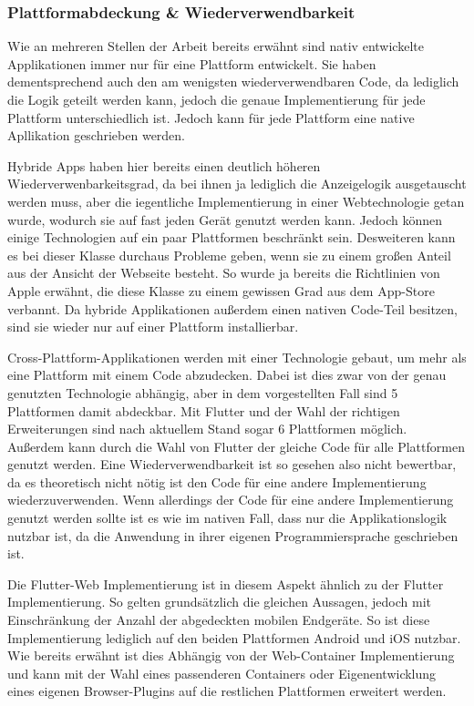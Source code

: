 \subsubsection{Plattformabdeckung \& Wiederverwendbarkeit}
Wie an mehreren Stellen der Arbeit bereits erwähnt sind nativ entwickelte Applikationen immer nur für eine Plattform entwickelt. Sie haben dementsprechend auch den am wenigsten wiederverwendbaren Code, da lediglich die Logik geteilt werden kann, jedoch die genaue Implementierung für jede Plattform unterschiedlich ist. Jedoch kann für jede Plattform eine native Apllikation geschrieben werden.

Hybride Apps haben hier bereits einen deutlich höheren Wiederverwenbarkeitsgrad, da bei ihnen ja lediglich die Anzeigelogik ausgetauscht werden muss, aber die iegentliche Implementierung in einer Webtechnologie getan wurde, wodurch sie auf fast jeden Gerät genutzt werden kann. Jedoch können einige Technologien auf ein paar Plattformen beschränkt sein. Desweiteren kann es bei dieser Klasse durchaus Probleme geben, wenn sie zu einem großen Anteil aus der Ansicht der Webseite besteht. So wurde ja bereits die Richtlinien von Apple erwähnt, die diese Klasse zu einem gewissen Grad aus dem App-Store verbannt. Da hybride Applikationen außerdem einen nativen Code-Teil besitzen, sind sie wieder nur auf einer Plattform installierbar. 

Cross-Plattform-Applikationen werden mit einer Technologie gebaut, um mehr als eine Plattform mit einem Code abzudecken. Dabei ist dies zwar von der genau genutzten Technologie abhängig, aber in dem vorgestellten Fall sind 5 Plattformen damit abdeckbar. Mit Flutter und der Wahl der richtigen Erweiterungen sind nach aktuellem Stand sogar 6 Plattformen möglich. Außerdem kann durch die Wahl von Flutter der gleiche Code für alle Plattformen genutzt werden. Eine Wiederverwendbarkeit ist so gesehen also nicht bewertbar, da es theoretisch nicht nötig ist den Code für eine andere Implementierung wiederzuverwenden. Wenn allerdings der Code für eine andere Implementierung genutzt werden sollte ist es wie im nativen Fall, dass nur die Applikationslogik nutzbar ist, da die Anwendung in ihrer eigenen Programmiersprache geschrieben ist.

Die Flutter-Web Implementierung ist in diesem Aspekt ähnlich zu der Flutter Implementierung. So gelten grundsätzlich die gleichen Aussagen, jedoch mit Einschränkung der Anzahl der abgedeckten mobilen Endgeräte. So ist diese Implementierung lediglich auf den beiden Plattformen Android und iOS nutzbar. Wie bereits erwähnt ist dies Abhängig von der Web-Container Implementierung und kann mit der Wahl eines passenderen Containers oder Eigenentwicklung eines eigenen Browser-Plugins auf die restlichen Plattformen erweitert werden.


